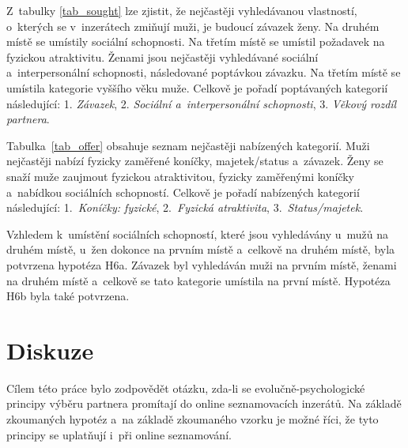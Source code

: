 \documentclass[a4paper, 12pt, notitlepage, oneside, numbers=noenddot]{report}
\begin{document}
Z~tabulky \ref{tab_sought} lze zjistit, že nejčastěji vyhledávanou
vlastností, o~kterých se v~inzerátech zmiňují muži, je budoucí závazek
ženy.  Na druhém místě se umístily sociální schopnosti.  Na třetím
místě se umístil požadavek na fyzickou atraktivitu.  Ženami jsou
nejčastěji vyhledávané sociální a~interpersonální schopnosti,
následované poptávkou závazku.  Na třetím místě se umístila kategorie
vyššího věku muže.  Celkově je pořadí poptávaných ka\-te\-gorií
následující: 1. \emph{Závazek}, 2. \emph{Sociální a~interpersonální
  schopnosti}, 3. \emph{Věkový rozdíl partnera}.


Tabulka~\ref{tab_offer} obsahuje seznam nejčastěji nabízených
kategorií.  Muži nejčastěji nabízí fyzicky zaměřené koníčky,
majetek/status a~závazek.  Ženy se snaží muže zaujmout fy\-zickou
atraktivitou, fyzicky zaměřenými koníčky a~nabídkou sociálních
schopností.  Celkově je pořadí nabízených kategorií následující:
1.~\emph{Koníčky: fyzické}, 2.~\emph{Fyzická atraktivita},
3.~\emph{Status/majetek}.

Vzhledem k~umístění sociálních schopností, které jsou vyhledávány
u~mužů na druhém místě, u~žen dokonce na prvním místě a~celkově na
druhém místě, byla potvrzena hypotéza H6a.  Závazek byl vyhledáván muži
na prvním místě, ženami na druhém místě a~celkově se tato kategorie
umístila na první místě.  Hypotéza H6b byla také potvrzena.

\section[Diskuze]{Diskuze}

Cílem této práce bylo zodpovědět otázku, zda-li se
evolučně-psychologické principy výběru partnera promítají do online
seznamovacích inzerátů.  Na základě zkoumaných hypotéz a~na základě
zkoumaného vzorku je možné říci, že tyto principy se uplatňují i~při
online seznamování.
\end{document}
